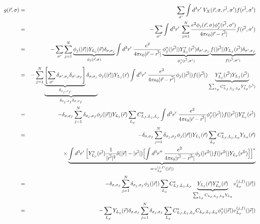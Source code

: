 \documentclass[11pt,a4paper]{report}
\begin{document}
\begin{eqnarray*}
g(\vec{r},\sigma)&=&\sum_{\sigma'}\int d^3r'\;
V_X(\vec{r},\sigma,\vec{r'},\sigma') f(\vec{r'},\sigma')
\\
&=&-\sum_{\sigma'}\int d^3r'\; 
\sum_{j=1}^N\frac{e^2 \phi_j(\vec{r},\sigma)\phi^*_j(\vec{r'},\sigma')}
{4\pi\epsilon_0|\vec{r}-\vec{r'}|}
f(\vec{r'},\sigma')
\\
&=&
-\sum_{\sigma'}\sum_{j=1}^N
\underbrace{\phi_j(|\vec{r}|)Y_{L_j}(\vec{r})\delta_{\sigma,\sigma_j}
}_{\phi_j(\vec{r},\sigma)}
\int d^3r'\; \frac{e^2}
{4\pi\epsilon_0|\vec{r}-\vec{r'}|}
\underbrace{
\phi^*_j(|\vec{r'}|)Y^*_{L_j}(\vec{r'})\delta_{\sigma',\sigma_j}
}_{\phi^*_j(\vec{r'},\sigma')}
\underbrace{
f(|\vec{r'}|)Y_{L_f}(\vec{r'})\delta_{\sigma',\sigma_f}
}_{f(\vec{r'},\sigma')}
 \\
&=&
-\sum_{j=1}^N
\underbrace{
\underbrace{
\left[\sum_{\sigma'}\delta_{\sigma',\sigma_j}\delta_{\sigma',\sigma_f}\right]
}_{\delta_{\sigma_j,\sigma_f}}
\delta_{\sigma,\sigma_j}
}_{\delta_{\sigma_j,\sigma_f}\delta_{\sigma,\sigma_f}}
\phi_j(|\vec{r}|)Y_{L_j}(\vec{r})
\int d^3r'\; \frac{e^2}
{4\pi\epsilon_0|\vec{r}-\vec{r'}|}
\phi_j(|\vec{r'}|)
f(|\vec{r'}|)
\underbrace{
Y^*_{L_j}(\vec{r'})Y_{L_f}(\vec{r'})
}_{\sum_{L_\rho}C^*_{L_f,L_j,L_\rho}Y^*_{L_\rho}(\vec{r'})}
\\
&=&
-\delta_{\sigma,\sigma_f}\sum_{j=1}^N\delta_{\sigma_j,\sigma_f}
\phi_j(|\vec{r}|)Y_{L_j}(\vec{r})
\sum_{L_\rho}C^*_{L_f,L_j,L_\rho}
\int d^3r'\; \frac{e^2}
{4\pi\epsilon_0|\vec{r}-\vec{r'}|}
\phi^*_j(|\vec{r'}|)f(|\vec{r'}|)Y^*_{L_\rho}(\vec{r'})
\\
&=&
-\delta_{\sigma,\sigma_f}\sum_{j=1}^N\delta_{\sigma_j,\sigma_f}
\phi_j(|\vec{r}|)Y_{L_j}(\vec{r})
\sum_{L_\rho}C^*_{L_f,L_j,L_\rho} Y_{L_\rho}(\vec{r})
\\
&&\times
\underbrace{
\int d^3r'\;\Bigl[Y^*_{L_\rho}(\vec{r'})\frac{1}{|\vec{r'}|^2}\delta(|\vec{r}|-|\vec{r'}|)
\Bigl[\int d^3r''\; \frac{e^2}
{4\pi\epsilon_0|\vec{r'}-\vec{r''}|}
\phi_j(|\vec{r''}|)f(|\vec{r''}|)Y_{L_\rho}(\vec{r''})\Bigr]\Bigr]^*
}_{=:v_{L_\rho}^{(j,f)}(|\vec{r}|)}
\\
&=&
-\delta_{\sigma,\sigma_f}\sum_{j=1}^N\delta_{\sigma_j,\sigma_f}
\phi_j(|\vec{r}|)
\sum_{L_\rho}C^*_{L_f,L_j,L_\rho} 
\underbrace{Y_{L_j}(\vec{r})Y^*_{L_\rho}(\vec{r})}_{\sum_{L_g}C_{L_\rho,L_j,L_g}Y_{L_g}}
v_{L_\rho}^{(j,f)}(|\vec{r}|)
\\
&=&-\sum_{L_g}Y_{L_g}(\vec{r})\delta_{\sigma,\sigma_f}
\sum_{j=1}^N\delta_{\sigma_j,\sigma_f}
\sum_{L_\rho}C^*_{L_f,L_j,L_\rho} C_{L_\rho,L_j,L_g}
\phi_j^*(|\vec{r}|)v_{L_\rho}^{(j,f)}(|\vec{r}|)
\end{eqnarray*}
\end{document}
